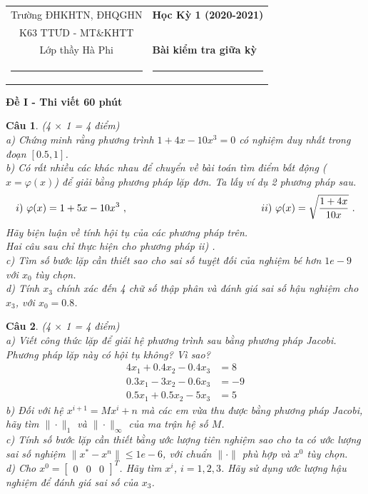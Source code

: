 \documentclass[11pt]{article}
\newtheorem{bt}{Câu}
\newcommand{\m}[1]{
	\begin{bmatrix}
		#1
	\end{bmatrix}
}
\begin{document}
\begin{tabular*}
{\linewidth}{c>{\centering\hspace{0pt}} p{}}
Trường ĐHKHTN, ĐHQGHN & {\bf Học Kỳ 1 (2020-2021)}
\tabularnewline
K63 TTƯD - MT\&KHTT \\ Lớp thầy Hà Phi & {\bf Bài kiểm tra giữa kỳ}
\tabularnewline
\rule{1in}{1pt}  \small  & \rule{2in}{1pt} %
\tabularnewline

\end{tabular*}
%

\begin{center}	
\textbf{Đề I - Thi viết 60 phút}
\end{center}

\begin{bt}(4 $\times$ 1 = 4 điểm) \\
a)	Chứng minh rằng phương trình $1+4x-10x^3=0$ có nghiệm duy nhất trong đoạn $[0.5, 1]$. \\
b)	Có rất nhiều các khác nhau để chuyển về bài toán tìm điểm bất động ($x=\varphi(x)$) để giải bằng phương pháp lặp đơn. Ta lấy ví dụ 2 phương pháp sau.
%
\[
i) \ \varphi(x) = 1+5x-10x^3 \ , \hskip 4cm \qquad ii) \ \varphi(x) = \sqrt{\dfrac{1+4x}{10x}} \ .
\]
%
Hãy biện luận về tính hội tụ của các phương pháp trên. \\
Hai câu sau chỉ thực hiện cho phương pháp ii) . \\
c) Tìm số bước lặp cần thiết sao cho sai số tuyệt đối của nghiệm bé hơn $1e-9$ với $x_0$ tùy chọn. \\
d) Tính $x_3$ chính xác đến 4 chữ số thập phân và đánh giá sai số hậu nghiệm cho $x_3$, với $x_0 = 0.8$. 
\end{bt}


\begin{bt}(4 $\times$ 1 = 4 điểm) \\
	a) Viết công thức lặp để giải hệ phương trình sau bằng phương pháp Jacobi. Phương pháp lặp này có hội tụ không? Vì sao?
	\begin{align*}
	4 x_1 + 0.4 x_2 - 0.4 x_3 &= 8 \\
	0.3 x_1 - 3 x_2 - 0.6 x_3 &= -9 \\
	0.5 x_1 + 0.5 x_2 - 5 x_3 &= 5 
	\end{align*}
	b) Đối với hệ $x^{i+1} = M x^{i} + n$ mà các em vừa thu được bằng phương pháp Jacobi, hãy tìm $\|\cdot\|_1$ và $\|\cdot\|_{\infty}$ của ma trận hệ số $M$. \\
	c) Tính số bước lặp cần thiết bằng ước lượng tiên nghiệm sao cho ta có ước lượng sai số nghiệm $\|x^*-x^n\| \leq 1e-6$, với chuẩn $\|\cdot\|$ phù hợp và $x^0$ tùy chọn. \\
	d) Cho $x^0 = \m{0 & 0 & 0}^T$. Hãy tìm $x^i$, $i=1,2,3$. Hãy sử dụng ước lượng hậu nghiệm để đánh giá sai số của $x_3$.
\end{bt}
\end{document}
